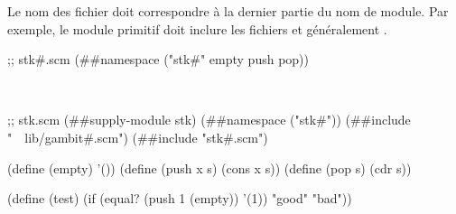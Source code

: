 Le nom des fichier doit correspondre à la dernier partie du nom de module.  Par
exemple, le module primitif  doit inclure les fichiers
 et généralement .\\
\begin{center}
\begin{mplisting}{0.9}
;; stk#.scm
(##namespace ("stk#" empty push pop))
\end{mplisting}\\[4ex]
\begin{mplisting}{0.9}
;; stk.scm
(##supply-module stk)
(##namespace ("stk#"))
(##include "~~lib/gambit#.scm")
(##include "stk#.scm")

(define (empty) '())
(define (push x s) (cons x s))
(define (pop s) (cdr s))

(define (test)
  (if (equal? (push 1 (empty)) '(1))
      "good"
      "bad"))
\end{mplisting}
\end{center}


%

